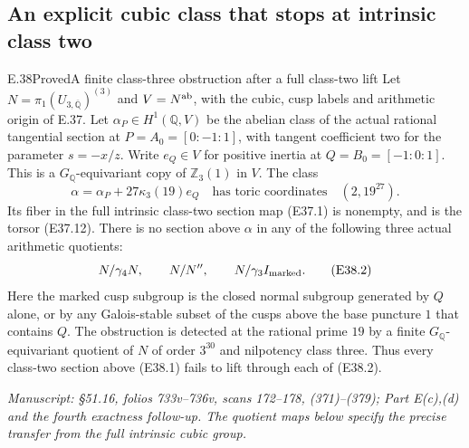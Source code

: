 \subsection{An explicit cubic class that stops at intrinsic class two}

\begin{statement}{E.38}{Proved}{A finite class-three obstruction after a full class-two lift}
Let $N=\pi_1(U_{3,\overline{\mathbb Q}})^{(3)}$ and
$V=N^{\rm ab}$, with the cubic, cusp labels and arithmetic
origin of E.37. Let $\alpha_P\in H^1(\mathbb Q,V)$ be the
abelian class of the actual rational tangential section at
$P=A_0=[0:-1:1]$, with tangent coefficient two for the
parameter $s=-x/z$. Write $e_Q\in V$ for positive inertia
at $Q=B_0=[-1:0:1]$. This is a $G_{\mathbb Q}$-equivariant
copy of $\mathbb Z_3(1)$ in $V$. The class
\[
 \alpha=\alpha_P+27\kappa_3(19)e_Q
 \quad\text{has toric coordinates}\quad (2,19^{27}).
 \tag{E38.1}
\]
Its fiber in the full intrinsic class-two section map
(E37.1) is nonempty, and is the torsor (E37.12).
There is no section above $\alpha$ in any of the following
three actual arithmetic quotients:
\[
 N/\gamma_4N,\qquad N/N'',\qquad
 N/\gamma_3I_{\rm marked}.
 \tag{E38.2}
\]
Here the marked cusp subgroup is the closed normal subgroup
generated by $Q$ alone, or by any Galois-stable subset of the
cusps above the base puncture $1$ that contains $Q$.
The obstruction is detected at the rational prime $19$ by
a finite $G_{\mathbb Q}$-equivariant quotient of $N$ of
order $3^{30}$ and nilpotency class three. Thus every
class-two section above (E38.1) fails to lift through each
of (E38.2).

\emph{Manuscript: \S51.16, folios 733v--736v, scans 172--178,
(371)--(379); Part E(c),(d) and the fourth exactness follow-up.
The quotient maps below specify the precise transfer from the
full intrinsic cubic group.}
\end{statement}

